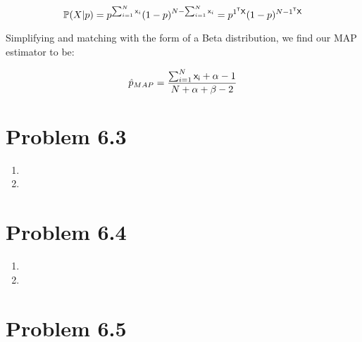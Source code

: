 \documentclass{article}
\begin{document}
\[ \mathbb{P}(X|p) = p^{\sum_{i=1}^{N} {\sf{x}}_i} (1 - p)^{N - \sum_{i=1}^{N} {\sf{x}}_i} =  p^{1^{{\sf{T}}}{\sf{X}}} (1 - p)^{N-1^{{\sf{T}}}{\sf{X}}} \]

Simplifying and matching with the form of a Beta distribution, we find our MAP estimator to be:

\[ \hat{p}_{MAP} = \frac{\sum_{i=1}^{N} {\sf{x}_i} + \alpha - 1}{N + \alpha + \beta - 2} \]

\section*{Problem 6.3}
  \begin{enumerate}[label=(\alph*)]
    \item 
    \item 
\end{enumerate}

\section*{Problem 6.4}
  \begin{enumerate}[label=(\alph*)]
    \item 
    \item 
\end{enumerate}

\section*{Problem 6.5}
\end{document}
